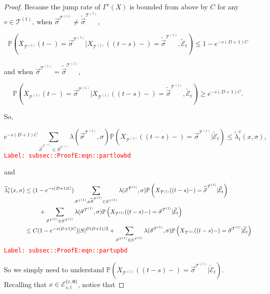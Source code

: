 \documentclass[12pt]{article}
\newcommand{\mb}{\mathbb}
\newcommand{\mc}{\mathcal}
\newcommand{\tr}{\textcolor{red}}
\newcommand{\labe}[1]{\tr{\texttt{Label: #1}}}
\newcommand{\pr}{\mb{P}}							%
\renewcommand{\root}{\mathbf{0}}				%
\renewcommand{\v}{v}							%
\renewcommand{\S}{S}							%
\newcommand{\s}{\sigma}							%
\newcommand{\sv}{\vec{\s}}						%
\newcommand{\x}{x}								%
\renewcommand{\t}{t}							%
\renewcommand{\tt}{s}							%
\newcommand{\X}{X}								%
\newcommand{\vind}[1]{^{#1}}					%
\newcommand{\carp}[1]{^{#1}}					%
\newcommand{\vsi}[1]{^{#1}}						%
\newcommand{\cind}[1]{_{#1}}					%
\newcommand{\tp}[1]{(#1)}						%
\newcommand{\ts}[1]{_{#1}}						%
\newcommand{\const}{C}							%
\newcommand{\degr}{D}							%
\newcommand{\tree}{\mc{T}}						%
\newcommand{\sln}[1]{^{(#1)}}					%
\newcommand{\rate}{\lambda}						%
\newcommand{\alt}[1]{\widetilde{#1}}			%
\newcommand{\evnt}{\mc{E}}						%
\newcommand{\pmap}{\Gamma}						%
\newcommand{\crate}{\alt{\lambda}}				%
\begin{document}
\begin{proof}
Because the jump rate of \(\pmap\vind{\v}(\X)\) is bounded from above by \(\const\) for any \(\v\in\tree\sln{1}\),  when \(\sv\vsi{\tree\sln{1}}\neq\alt{\sv}\vsi{\tree\sln{1}}\), 

\[\pr\left(\X\cind{\tree\sln{1}}\tp{\t-} = \sv\vsi{\tree\sln{1}}|\X\cind{\tree\sln{1}}\tp{(\t-\tt)-}=\alt{\sv}\vsi{\tree\sln{1}},\alt{\evnt}\ts{\t}\right) \leq 1-e^{-\tt(\degr+1)\const}\]

and when \(\sv\vsi{\tree\sln{1}}=\alt{\sv}\vsi{\tree\sln{1}}\),

\[\pr\left(\X\cind{\tree\sln{1}}\tp{\t-} = \sv\vsi{\tree\sln{1}}|\X\cind{\tree\sln{1}}\tp{(\t-\tt)-}=\alt{\sv}\vsi{\tree\sln{1}},\alt{\evnt}\ts{\t}\right) \geq e^{-\tt(\degr+1)\const}.\]

So,

\begin{equation}
e^{-\tt(\degr+1)\const}\sum_{\sv\vsi{\tree\sln{1}}\in \S\carp{\tree\sln{1}}} \rate(\sv\vsi{\tree\sln{1}},\s)\pr\left(\X\cind{\tree\sln{1}}\tp{(\t-\tt)-}=\sv\vsi{\tree\sln{1}}|\alt{\evnt}\ts{\t}\right) \leq \crate\vind{\v}\ts{\t}(\x,\s),
\label{subsec::ProofE:eqn::partlowbd}
\end{equation}
\labe{subsec::ProofE:eqn::partlowbd}

and

\begin{align}
\crate\vind{\v}\ts{\t}(\x,\s)&\leq (1 - e^{-\tt(\degr+1)\const})\sum_{\sv\vsi{\tree\sln{1}}\neq \alt{\sv}\vsi{\tree\sln{1}} \in \S\carp{\tree\sln{1}}} \rate(\sv\vsi{\tree\sln{1}},\s)\pr\left(\X\cind{\tree\sln{1}}\tp{(\t-\tt)-}=\alt{\sv}\vsi{\tree\sln{1}}|\alt{\evnt}\ts{\t}\right)\nonumber\\
&\hspace{24 pt} +\sum_{\sv\vsi{\tree\sln{1}} \in \S\carp{\tree\sln{1}}} \rate(\sv\vsi{\tree\sln{1}},\s)\pr\left(\X\cind{\tree\sln{1}}\tp{(\t-\tt)-}=\sv\vsi{\tree\sln{1}}|\alt{\evnt}\ts{\t}\right)\nonumber\\
&\leq \const(1 - e^{-\tt(\degr+1)\const})|\S|^{\degr(\degr+1)/2} + \sum_{\sv\vsi{\tree\sln{1}} \in \S\carp{\tree\sln{1}}} \rate(\sv\vsi{\tree\sln{1}},\s)\pr\left(\X\cind{\tree\sln{1}}\tp{(\t-\tt)-}=\sv\vsi{\tree\sln{1}}|\alt{\evnt}\ts{\t}\right)
\label{subsec::ProofE:eqn::partupbd}
\end{align}
\labe{subsec::ProofE:eqn::partupbd}

So we simply need to understand \(\pr\left(\X\cind{\tree\sln{1}}\tp{(\t-\tt)-}=\sv\vsi{\tree\sln{1}}|\alt{\evnt}\ts{\t}\right)\). Recalling that \(\x \in \evnt^{\{\v,\root\}}_{\tt,\t}\), notice that


\end{proof}
\end{document}
